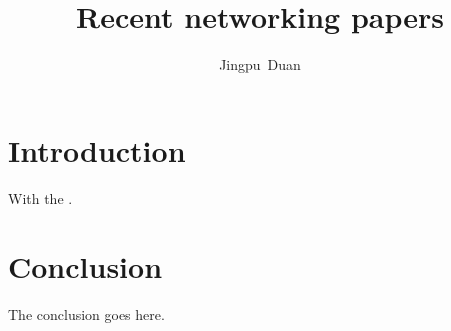 \documentclass[10pt,journal,compsoc]{IEEEtran}
\begin{document}
\title{Recent networking papers}

\author{
  Jingpu~Duan
}




\maketitle

\IEEEdisplaynontitleabstractindextext
\IEEEpeerreviewmaketitle



\section{Introduction}
\label{sec:introduction}

With the \cite{zhang2020blockchain}.

\section{Conclusion}
The conclusion goes here.






\ifCLASSOPTIONcaptionsoff
  \newpage
\fi

{}

\end{document}
